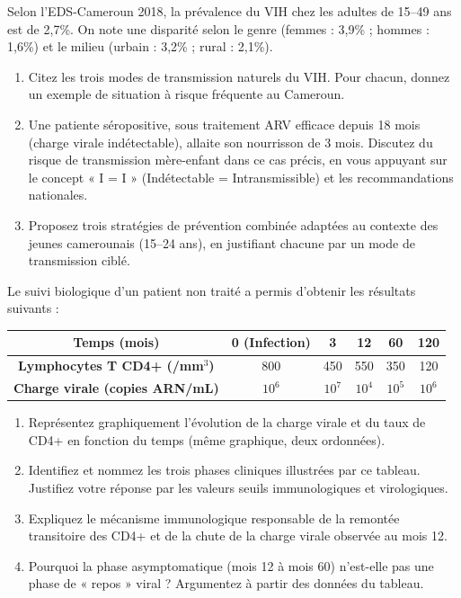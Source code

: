 \documentclass[11pt]{article}
\begin{document}
\begin{exercice}
Selon l'EDS-Cameroun 2018, la prévalence du VIH chez les adultes de 15--49 ans est de 2,7\%. On note une disparité selon le genre (femmes : 3,9\% ; hommes : 1,6\%) et le milieu (urbain : 3,2\% ; rural : 2,1\%).
\begin{enumerate}
    \item Citez les trois modes de transmission naturels du VIH. Pour chacun, donnez un exemple de situation à risque fréquente au Cameroun. 
    \item Une patiente séropositive, sous traitement ARV efficace depuis 18 mois (charge virale indétectable), allaite son nourrisson de 3 mois. Discutez du risque de transmission mère-enfant dans ce cas précis, en vous appuyant sur le concept « I = I » (Indétectable = Intransmissible) et les recommandations nationales. 
    \item Proposez trois stratégies de prévention combinée adaptées au contexte des jeunes camerounais (15--24 ans), en justifiant chacune par un mode de transmission ciblé.
\end{enumerate}
\end{exercice}

\begin{exercice}
Le suivi biologique d'un patient non traité a permis d'obtenir les résultats suivants :

\begin{center}
\begin{tabular}{|c|c|c|c|c|c|}
\hline
\textbf{Temps (mois)} & 0 (Infection) & 3 & 12 & 60 & 120 \\
\hline
\textbf{Lymphocytes T CD4+ (/mm$^3$)} & 800 & 450 & 550 & 350 & 120 \\
\hline
\textbf{Charge virale (copies ARN/mL)} & $10^6$ & $10^7$ & $10^4$ & $10^5$ & $10^6$ \\
\hline
\end{tabular}
\end{center}

\begin{enumerate}
    \item Représentez graphiquement l'évolution de la charge virale et du taux de CD4+ en fonction du temps (même graphique, deux ordonnées). 
    \item Identifiez et nommez les trois phases cliniques illustrées par ce tableau. Justifiez votre réponse par les valeurs seuils immunologiques et virologiques. 
    \item Expliquez le mécanisme immunologique responsable de la remontée transitoire des CD4+ et de la chute de la charge virale observée au mois 12. 
    \item Pourquoi la phase asymptomatique (mois 12 à mois 60) n'est-elle pas une phase de « repos » viral ? Argumentez à partir des données du tableau.
\end{enumerate}
\end{exercice}
\end{document}
